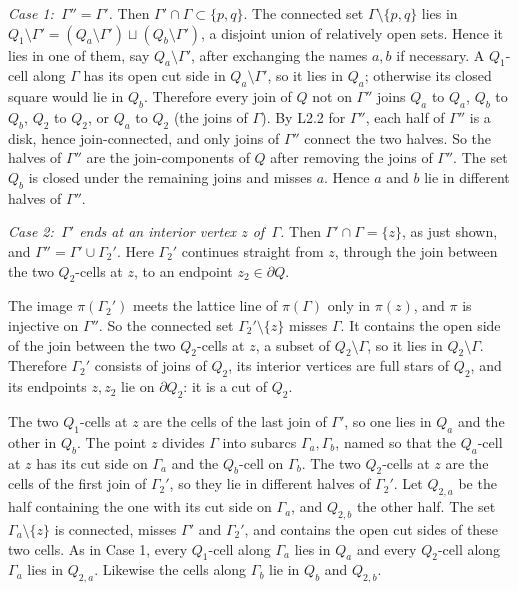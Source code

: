 \documentclass[
  11pt,
]{article}
\begin{document}
\emph{Case 1: \(\,\Gamma''=\Gamma'\).} Then
\(\Gamma'\cap \Gamma\subset\{p,q\}\). The connected set
\(\Gamma\setminus\{p,q\}\) lies in
\(Q_1\setminus \Gamma'=(Q_a\setminus \Gamma')\sqcup(Q_b\setminus \Gamma')\),
a disjoint union of relatively open sets. Hence it lies in one of them,
say \(Q_a\setminus \Gamma'\), after exchanging the names \(a,b\) if
necessary. A \(Q_1\)-cell along \(\Gamma\) has its open cut side in
\(Q_a\setminus \Gamma'\), so it lies in \(Q_a\); otherwise its closed
square would lie in \(Q_b\). Therefore every join of \(Q\) not on
\(\Gamma''\) joins \(Q_a\) to \(Q_a\), \(Q_b\) to \(Q_b\), \(Q_2\) to
\(Q_2\), or \(Q_a\) to \(Q_2\) (the joins of \(\Gamma\)). By L2.2 for
\(\Gamma''\), each half of \(\Gamma''\) is a disk, hence join-connected,
and only joins of \(\Gamma''\) connect the two halves. So the halves of
\(\Gamma''\) are the join-components of \(Q\) after removing the joins
of \(\Gamma''\). The set \(Q_b\) is closed under the remaining joins and
misses \(a\). Hence \(a\) and \(b\) lie in different halves of
\(\Gamma''\).

\emph{Case 2: \(\,\Gamma'\) ends at an interior vertex \(z\) of
\(\,\Gamma\).} Then \(\Gamma'\cap \Gamma=\{z\}\), as just shown, and
\(\Gamma''=\Gamma'\cup \Gamma_2'\). Here \(\Gamma_2'\) continues
straight from \(z\), through the join between the two \(Q_2\)-cells at
\(z\), to an endpoint \(z_2\in\partial Q\).

The image \(\pi(\Gamma_2')\) meets the lattice line of \(\pi(\Gamma)\)
only in \(\pi(z)\), and \(\pi\) is injective on \(\Gamma''\). So the
connected set \(\Gamma_2'\setminus\{z\}\) misses \(\Gamma\). It contains
the open side of the join between the two \(Q_2\)-cells at \(z\), a
subset of \(Q_2\setminus \Gamma\), so it lies in
\(Q_2\setminus \Gamma\). Therefore \(\Gamma_2'\) consists of joins of
\(Q_2\), its interior vertices are full stars of \(Q_2\), and its
endpoints \(z,z_2\) lie on \(\partial Q_2\): it is a cut of \(Q_2\).

The two \(Q_1\)-cells at \(z\) are the cells of the last join of
\(\Gamma'\), so one lies in \(Q_a\) and the other in \(Q_b\). The point
\(z\) divides \(\Gamma\) into subarcs \(\Gamma_a,\Gamma_b\), named so
that the \(Q_a\)-cell at \(z\) has its cut side on \(\Gamma_a\) and the
\(Q_b\)-cell on \(\Gamma_b\). The two \(Q_2\)-cells at \(z\) are the
cells of the first join of \(\Gamma_2'\), so they lie in different
halves of \(\Gamma_2'\). Let \(Q_{2,a}\) be the half containing the one
with its cut side on \(\Gamma_a\), and \(Q_{2,b}\) the other half. The
set \(\Gamma_a\setminus\{z\}\) is connected, misses \(\Gamma'\) and
\(\Gamma_2'\), and contains the open cut sides of these two cells. As in
Case 1, every \(Q_1\)-cell along \(\Gamma_a\) lies in \(Q_a\) and every
\(Q_2\)-cell along \(\Gamma_a\) lies in \(Q_{2,a}\). Likewise the cells
along \(\Gamma_b\) lie in \(Q_b\) and \(Q_{2,b}\).
\end{document}

